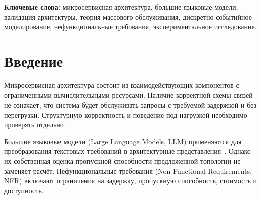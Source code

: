 ﻿\begin{abstract}
Автоматическое проектирование микросервисных архитектур с помощью больших языковых моделей позволяет получать варианты топологии из текстовых требований, однако синтаксически корректное представление не доказывает выполнения требований к производительности. В работе формализуется задача проверки таких архитектур и предлагается методика сравнительного исследования трёх уровней валидации: структурных ограничений графа, аналитических моделей теории массового обслуживания и дискретно-событийного моделирования. Рассматриваются условия применимости моделей очередей, конечные буферы, случайная нагрузка и статистическая неопределённость перцентилей задержки. Предложен план экспериментов для сопоставления одношаговой генерации и итеративного исправления по результатам проверок, в том числе для локальных языковых моделей. Определены эталоны, измеряемые показатели и критерии достоверности. Количественная проверка гипотез запланирована, поэтому результаты и утверждения о превосходстве методов пока не приводятся.

\end{abstract}

\vspace{0.5em}

\noindent\textbf{Ключевые слова:} микросервисная архитектура, большие языковые модели, валидация архитектуры, теория массового обслуживания, дискретно-событийное моделирование, нефункциональные требования, экспериментальное исследование.

\section{Введение}

Микросервисная архитектура состоит из взаимодействующих компонентов с ограниченными вычислительными ресурсами. Наличие корректной схемы связей не означает, что система будет обслуживать запросы с требуемой задержкой и без перегрузки. Структурную корректность и поведение под нагрузкой необходимо проверять отдельно~\cite{bass2015software,harchol2013performance}.

Большие языковые модели (Large Language Models, LLM) применяются для преобразования текстовых требований в архитектурные представления~\cite{hou2024large,liu2024agent4se}. Однако их собственная оценка пропускной способности предложенной топологии не заменяет расчёт. Нефункциональные требования (Non-Functional Requirements, NFR) включают ограничения на задержку, пропускную способность, стоимость и доступность.

